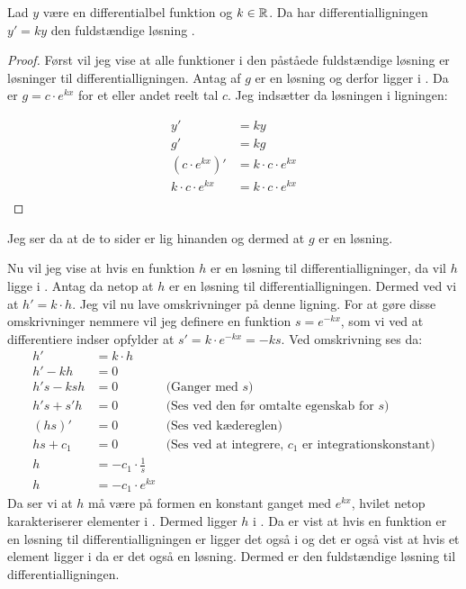\begin{thm}\label{thm:y'=k*y}
Lad $y$ være en differentialbel funktion og $k\in \mathbb{R}$. Da har  differentialligningen $y' = ky$ den fuldstændige løsning \LosEks.
\end{thm}
\begin{proof}
Først vil jeg vise at alle funktioner i den påståede fuldstændige løsning er løsninger til differentialligningen.
Antag af $g$ er en løsning og derfor ligger i \LosEks .
Da er $g=c\cdot e^{kx}$ for et eller andet reelt tal $c$.
Jeg indsætter da løsningen i ligningen: 

\begin{align*}
y' &= ky\\
g' &= kg\\
(c\cdot e^{kx})' &= k\cdot c\cdot e^{kx}\\
k\cdot c\cdot e^{kx} &= k\cdot c\cdot e^{kx}\\
\end{align*}
\end{proof}
Jeg ser da at de to sider er lig hinanden og dermed at $g$ er en løsning. 

Nu vil jeg vise at hvis en funktion $h$ er en løsning til differentialligninger, da vil $h$ ligge i \LosEks.
Antag da netop at $h$ er en løsning til differentialligningen. 
Dermed ved vi at $h'=k\cdot h$.
Jeg vil nu lave omskrivninger på denne ligning. 
For at gøre disse omskrivninger nemmere vil jeg definere en funktion $s=e^{-kx}$, som vi ved at differentiere indser opfylder at $s'=k \cdot e^{-kx} = -ks$.
Ved omskrivning ses da:
\begin{align*}
h'&=k\cdot h \\
h'-kh &= 0\\
h's-ksh&=0 		& \text{(Ganger med }s\text{)}\\
h's+s'h&=0		& \text{(Ses ved den før omtalte egenskab for $s$)}\\
(hs)'&=0		&\text{(Ses ved kædereglen)}\\
hs+c_1 &= 0		&\text{(Ses ved at integrere, $c_1$ er integrationskonstant)}\\
h&= -c_1 \cdot \frac{1}{s}\\
h&= -c_1 \cdot e^{kx}
\end{align*}
Da ser vi at $h$ må være på formen en konstant ganget med $e^{kx}$, hvilet netop karakteriserer elementer i \LosEks. 
Dermed ligger $h$ i \LosEks.
Da er vist at hvis en funktion er en løsning til differentialligningen er ligger det også i \LosEks og det er også vist at hvis et element ligger i \LosEks da er det også en løsning. 
Dermed er \LosEks den fuldstændige løsning til differentialligningen. 

